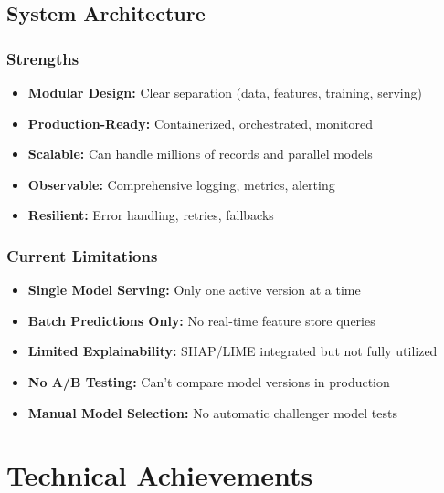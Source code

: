 \subsection{System Architecture}

\subsubsection{Strengths}
\begin{itemize}
    \item \textbf{Modular Design:} Clear separation (data, features, training, serving)
    \item \textbf{Production-Ready:} Containerized, orchestrated, monitored
    \item \textbf{Scalable:} Can handle millions of records and parallel models
    \item \textbf{Observable:} Comprehensive logging, metrics, alerting
    \item \textbf{Resilient:} Error handling, retries, fallbacks
\end{itemize}

\subsubsection{Current Limitations}
\begin{itemize}
    \item \textbf{Single Model Serving:} Only one active version at a time
    \item \textbf{Batch Predictions Only:} No real-time feature store queries
    \item \textbf{Limited Explainability:} SHAP/LIME integrated but not fully utilized
    \item \textbf{No A/B Testing:} Can't compare model versions in production
    \item \textbf{Manual Model Selection:} No automatic challenger model tests
\end{itemize}

\section{Technical Achievements}

